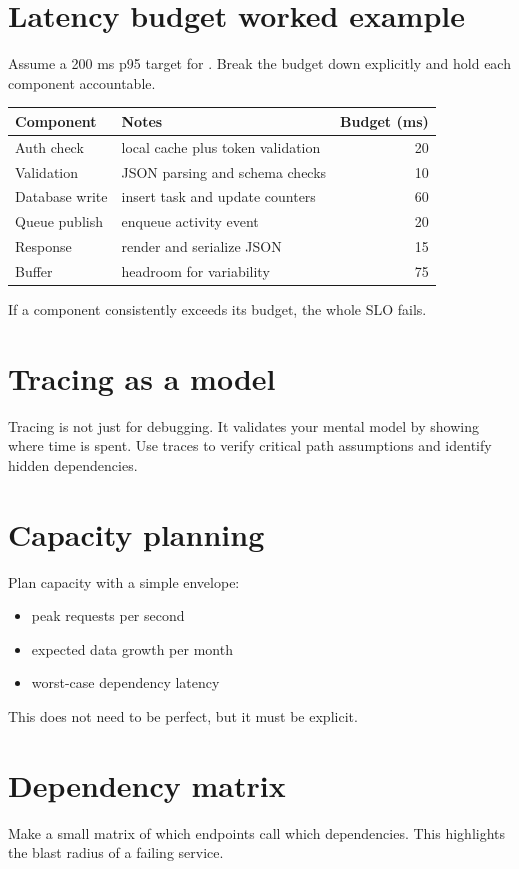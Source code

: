 \section{Latency budget worked example}
Assume a 200 ms p95 target for .
Break the budget down explicitly and hold each component accountable.

\begin{tabularx}{\textwidth}{@{}lXr@{}}
\toprule
Component & Notes & Budget (ms) \\
\midrule
Auth check & local cache plus token validation & 20 \\
Validation & JSON parsing and schema checks & 10 \\
Database write & insert task and update counters & 60 \\
Queue publish & enqueue activity event & 20 \\
Response & render and serialize JSON & 15 \\
Buffer & headroom for variability & 75 \\
\bottomrule
\end{tabularx}

If a component consistently exceeds its budget, the whole SLO fails.

\section{Tracing as a model}
Tracing is not just for debugging.
It validates your mental model by showing where time is spent.
Use traces to verify critical path assumptions and identify hidden dependencies.

\section{Capacity planning}
Plan capacity with a simple envelope:
\begin{itemize}[nosep]
  \item peak requests per second
  \item expected data growth per month
  \item worst-case dependency latency
\end{itemize}

This does not need to be perfect, but it must be explicit.

\section{Dependency matrix}
Make a small matrix of which endpoints call which dependencies.
This highlights the blast radius of a failing service.

